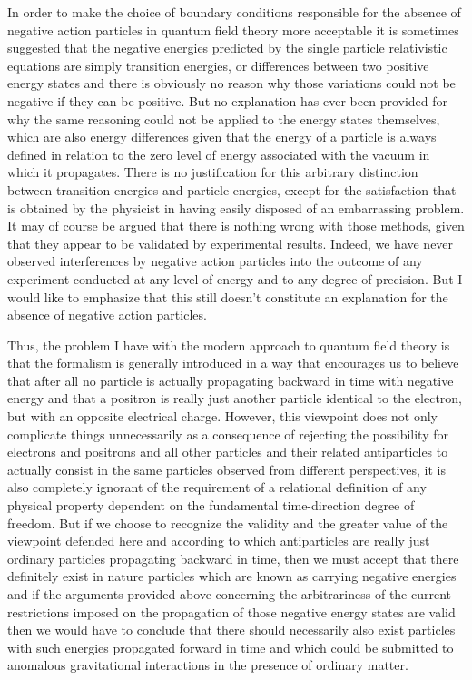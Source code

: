 \documentclass[notitlepage,12pt]{report}
\begin{document}
In order to make the choice of boundary conditions responsible for the absence of negative action particles in quantum field theory more acceptable it is sometimes suggested that the negative energies predicted by the single particle relativistic equations are simply transition energies, or differences between two positive energy states and there is obviously no reason why those variations could not be negative if they can be positive. But no explanation has ever been provided for why the same reasoning could not be applied to the energy states themselves, which are also energy differences given that the energy of a particle is always defined in relation to the zero level of energy associated with the vacuum in which it propagates. There is no justification for this arbitrary distinction between transition energies and particle energies, except for the satisfaction that is obtained by the physicist in having easily disposed of an embarrassing problem. It may of course be argued that there is nothing wrong with those methods, given that they appear to be validated by experimental results. Indeed, we have never observed interferences by negative action particles into the outcome of any experiment conducted at any level of energy and to any degree of precision. But I would like to emphasize that this still doesn't constitute an explanation for the absence of negative action particles.

Thus, the problem I have with the modern approach to quantum field theory is that the formalism is generally introduced in a way that encourages us to believe that after all no particle is actually propagating backward in time with negative energy and that a positron is really just another particle identical to the electron, but with an opposite electrical charge. However, this viewpoint does not only complicate things unnecessarily as a consequence of rejecting the possibility for electrons and positrons and all other particles and their related antiparticles to actually consist in the same particles observed from different perspectives, it is also completely ignorant of the requirement of a relational definition of any physical property dependent on the fundamental time-direction degree of freedom. But if we choose to recognize the validity and the greater value of the viewpoint defended here and according to which antiparticles are really just ordinary particles propagating backward in time, then we must accept that there definitely exist in nature particles which are known as carrying negative energies and if the arguments provided above concerning the arbitrariness of the current restrictions imposed on the propagation of those negative energy states are valid then we would have to conclude that there should necessarily also exist particles with such energies propagated forward in time and which could be submitted to anomalous gravitational interactions in the presence of ordinary matter.
\end{document}
